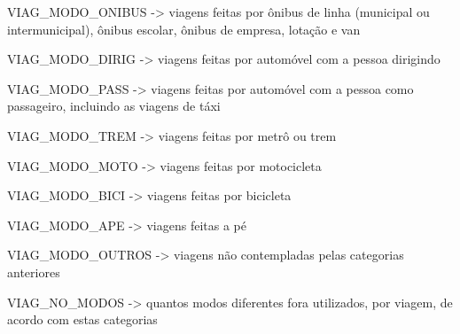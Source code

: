 \begin{compactitem}
    \begin{compactitem}[]
    \item VIAG_MODO_ONIBUS -> viagens feitas por ônibus de linha (municipal ou intermunicipal), ônibus escolar, ônibus de empresa, lotação e van
    \item VIAG_MODO_DIRIG -> viagens feitas por automóvel com a pessoa dirigindo
    \item VIAG_MODO_PASS -> viagens feitas por automóvel com a pessoa como passageiro, incluindo as viagens de táxi
    \item VIAG_MODO_TREM -> viagens feitas por metrô ou trem
    \item VIAG_MODO_MOTO -> viagens feitas por motocicleta
    \item VIAG_MODO_BICI -> viagens feitas por bicicleta
    \item VIAG_MODO_APE -> viagens feitas a pé
    \item VIAG_MODO_OUTROS -> viagens não contempladas pelas categorias anteriores
    \item VIAG_NO_MODOS -> quantos modos diferentes fora utilizados, por viagem, de acordo com estas categorias
    \end{compactitem}\


\end{compactitem}
